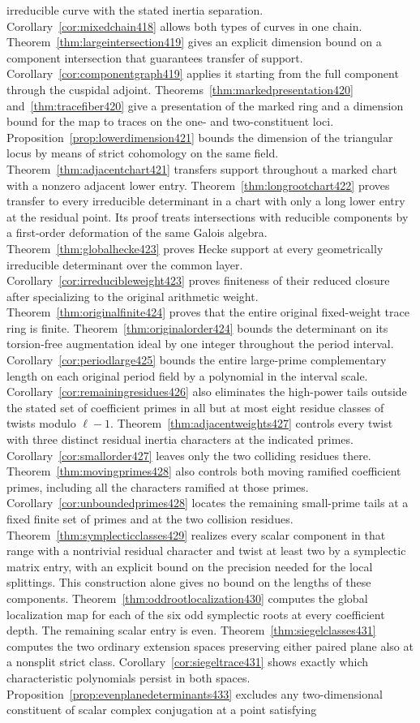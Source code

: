\documentclass[a4paper,11pt]{article}
\theoremstyle{definition}
\theoremstyle{remark}
\numberwithin{equation}{section}
\begin{document}
irreducible curve with the stated inertia separation. Corollary~\ref{cor:mixedchain418} allows both types of curves in one chain. Theorem~\ref{thm:largeintersection419} gives an explicit dimension bound on a component intersection that guarantees transfer of support. Corollary~\ref{cor:componentgraph419} applies it starting from the full component through the cuspidal adjoint. Theorems~\ref{thm:markedpresentation420} and~\ref{thm:tracefiber420} give a presentation of the marked ring and a dimension bound for the map to traces on the one- and two-constituent loci. Proposition~\ref{prop:lowerdimension421} bounds the dimension of the triangular locus by means of strict cohomology on the same field. Theorem~\ref{thm:adjacentchart421} transfers support throughout a marked chart with a nonzero adjacent lower entry. Theorem~\ref{thm:longrootchart422} proves transfer to every irreducible determinant in a chart with only a long lower entry at the residual point. Its proof treats intersections with reducible components by a first-order deformation of the same Galois algebra. Theorem~\ref{thm:globalhecke423} proves Hecke support at every geometrically irreducible determinant over the common layer. Corollary~\ref{cor:irreducibleweight423} proves finiteness of their reduced closure after specializing to the original arithmetic weight. Theorem~\ref{thm:originalfinite424} proves that the entire original fixed-weight trace ring is finite. Theorem~\ref{thm:originalorder424} bounds the determinant on its torsion-free augmentation ideal by one integer throughout the period interval. Corollary~\ref{cor:periodlarge425} bounds the entire large-prime complementary length on each original period field by a polynomial in the interval scale. Corollary~\ref{cor:remainingresidues426} also eliminates the high-power tails outside the stated set of coefficient primes in all but at most eight residue classes of twists modulo \(\ell-1\). Theorem~\ref{thm:adjacentweights427} controls every twist with three distinct residual inertia characters at the indicated primes. Corollary~\ref{cor:smallorder427} leaves only the two colliding residues there. Theorem~\ref{thm:movingprimes428} also controls both moving ramified coefficient primes, including all the characters ramified at those primes. Corollary~\ref{cor:unboundedprimes428} locates the remaining small-prime tails at a fixed finite set of primes and at the two collision residues. Theorem~\ref{thm:symplecticclasses429} realizes every scalar component in that range with a nontrivial residual character and twist at least two by a symplectic matrix entry, with an explicit bound on the precision needed for the local splittings. This construction alone gives no bound on the lengths of these components. Theorem~\ref{thm:oddrootlocalization430} computes the global localization map for each of the six odd symplectic roots at every coefficient depth. The remaining scalar entry is even. Theorem~\ref{thm:siegelclasses431} computes the two ordinary extension spaces preserving either paired plane also at a nonsplit strict class. Corollary~\ref{cor:siegeltrace431} shows exactly which characteristic polynomials persist in both spaces. Proposition~\ref{prop:evenplanedeterminants433} excludes any two-dimensional constituent of scalar complex conjugation at a point satisfying 
\end{document}

